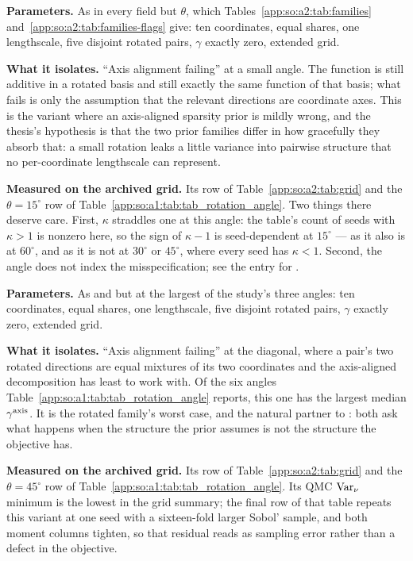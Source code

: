 \textbf{Parameters.} As  in every field but $\theta$, which
Tables~\ref{app:so:a2:tab:families}
and~\ref{app:so:a2:tab:families-flags} give: ten coordinates, equal shares,
one lengthscale, five disjoint rotated pairs, $\gamma$ exactly zero, extended grid.

\textbf{What it isolates.} ``Axis alignment failing'' at a small angle. The
function is still additive in a rotated basis and still exactly the same
function of that basis; what fails is only the assumption that the relevant
directions are coordinate axes. This is the variant where an axis-aligned
sparsity prior is mildly wrong, and the thesis's hypothesis is that the two
prior families differ in how gracefully they absorb that: a small rotation
leaks a little variance into pairwise structure that no per-coordinate
lengthscale can represent.

\textbf{Measured on the archived grid.} Its row of
Table~\ref{app:so:a2:tab:grid} and the $\theta=15^\circ$ row of
Table~\ref{app:so:a1:tab:tab_rotation_angle}. Two things there deserve care.
First, $\kappa$ straddles one at this angle: the table's count of seeds with
$\kappa>1$ is nonzero here, so the sign of $\kappa-1$ is seed-dependent at
$15^\circ$ --- as it also is at $60^\circ$, and as it is not at $30^\circ$ or
$45^\circ$, where every seed has $\kappa<1$. Second, the angle does not index
the misspecification; see the entry for .

\label{app:so:a2:rotated-t45}

\textbf{Parameters.} As  and  but at
the largest of the study's three angles: ten coordinates, equal shares, one
lengthscale, five disjoint rotated pairs, $\gamma$ exactly zero, extended grid.

\textbf{What it isolates.} ``Axis alignment failing'' at the diagonal, where a
pair's two rotated directions are equal mixtures of its two coordinates and the
axis-aligned decomposition has least to work with. Of the six angles
Table~\ref{app:so:a1:tab:tab_rotation_angle} reports, this one has the largest
median $\gamma^{\mathrm{axis}}$. It is the rotated family's worst case, and the natural partner
to : both ask what happens when the structure the prior
assumes is not the structure the objective has.

\textbf{Measured on the archived grid.} Its row of
Table~\ref{app:so:a2:tab:grid} and the $\theta=45^\circ$ row of
Table~\ref{app:so:a1:tab:tab_rotation_angle}. Its QMC $\operatorname{\mathrm{Var}}_\nu$ minimum is the
lowest in the grid summary; the final row of that table repeats this variant at
one seed with a sixteen-fold larger Sobol' sample, and both moment columns
tighten, so that residual reads as sampling error rather than a defect in the
objective.

